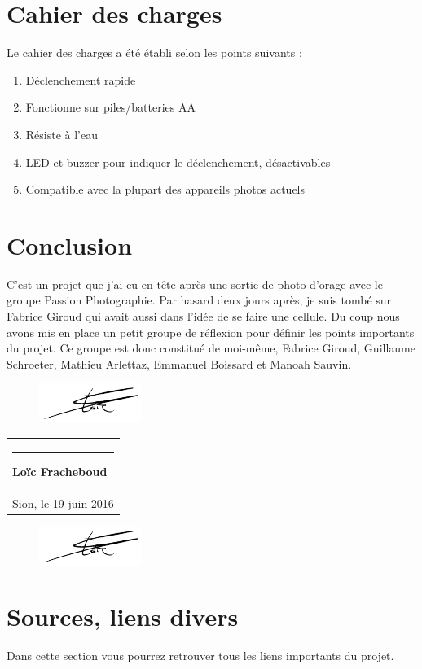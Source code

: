 \documentclass[a4paper,10pt]{article}
\newcommand{\signature}[2]{%
  \par\nobreak\bigskip
  \begin{singlespace}%
  \mbox{}\hfill\begin{tabular}{p{8cm} }
      \rule{8cm}{0.5pt}\newline{}%
        \textbf{#1}\\%
       #2 %
  \end{tabular}%
  \end{singlespace}%
  \medskip%
 }
\begin{document}
  \section{Cahier des charges}
  Le cahier des charges a été établi selon les points suivants :
  \begin{enumerate}
    \item Déclenchement rapide
    \item Fonctionne sur piles/batteries AA
    \item Résiste à l'eau
    \item LED et buzzer pour indiquer le déclenchement, désactivables
    \item Compatible avec la plupart des appareils photos actuels
    \end{enumerate}
    
 \section{Conclusion}
  C'est un projet que j'ai eu en tête après une sortie de photo d'orage avec le groupe Passion Photographie. Par hasard deux jours après, je suis tombé sur Fabrice Giroud qui avait aussi dans l'idée de se faire une cellule. Du coup nous avons mis en place un petit groupe de réflexion pour définir les points importants du projet. Ce groupe est donc constitué de moi-même, Fabrice Giroud, Guillaume Schroeter, Mathieu Arlettaz, Emmanuel Boissard et Manoah Sauvin.\\
 
 \begin{figure}
 \vspace{-52pt}
 \centering
 \includegraphics[scale=1]{signfracheboud}
 \end{figure}
 \signature{Loïc Fracheboud}{Sion, le 19 juin 2016} 
 
  \begin{figure}[!h]
 \centering
 \vspace{100pt}
 \includegraphics[scale=0.3]{images/signfracheboud}
 \end{figure}
 
 \pagebreak
 \section{Sources, liens divers}
 Dans cette section vous pourrez retrouver tous les liens importants du projet.
 
 
\end{document}
